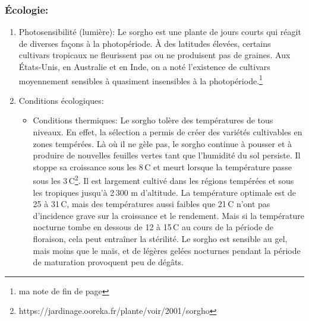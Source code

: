 \documentclass[a4paper,11pt]{article}
\begin{document}
\subsubsection{Écologie:}
\begin{enumerate}
 \item Photosensibilité (lumière):
Le sorgho est une plante de jours
courts qui réagit de diverses façons à la photopériode. À des
latitudes élevées, certains cultivars tropicaux ne fleurissent pas ou
ne produisent pas de graines. Aux États-Unis, en Australie et en Inde,
on a noté l’existence de cultivars moyennement sensibles à quasiment
insensibles à la photopériode.\footnote{ma note de fin de page}
\item Conditions écologiques:
  \begin{itemize}
\item Conditions thermiques:
Le sorgho tolère des températures de tous niveaux. En effet, la sélection a permis de créer
des variétés cultivables en zones tempérées. Là où il ne gèle pas, le
sorgho continue à pousser et à produire de nouvelles feuilles vertes
tant que l’humidité du sol persiste. Il stoppe sa croissance sous les
8\,\degree{}C et meurt lorsque la température passe sous les
3\,\degree{}C\footnote{https://jardinage.ooreka.fr/plante/voir/2001/sorgho}. Il
est largement cultivé dans les régions tempérées et sous les tropiques
jusqu’à 2\,300 m d’altitude. La température optimale est de 25 à
31\,\degree{}C, mais des températures aussi faibles que 21\,\degree{}C
n’ont pas d’incidence grave sur la croissance et le rendement. Mais si
la température nocturne tombe en dessous de 12 à 15\,\degree{}C au
cours de la période de floraison, cela peut entraîner la stérilité. Le
sorgho est sensible au gel, mais moins que le maïs, et de légères
gelées nocturnes pendant la période de maturation provoquent peu de
dégâts.


\end{itemize}
\end{enumerate}
\end{document}
